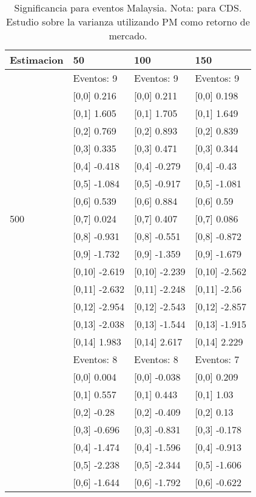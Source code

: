 \begin{table}

\caption{Significancia para eventos Malaysia. Nota: para CDS. Estudio sobre la varianza utilizando PM como retorno de mercado.}
\centering
\begin{tabular}[t]{llll}
\toprule
Estimacion & 50 & 100 & 150\\
\midrule
 & Eventos:  9 & Eventos:  9 & Eventos:  9\\
 & {}[0,0] 0.216 & {}[0,0] 0.211 & {}[0,0] 0.198\\
 & {}[0,1] 1.605 & {}[0,1] 1.705 & {}[0,1] 1.649\\
 & {}[0,2] 0.769 & {}[0,2] 0.893 & {}[0,2] 0.839\\
 & {}[0,3] 0.335 & {}[0,3] 0.471 & {}[0,3] 0.344\\
\addlinespace
 & {}[0,4] -0.418 & {}[0,4] -0.279 & {}[0,4] -0.43\\
 & {}[0,5] -1.084 & {}[0,5] -0.917 & {}[0,5] -1.081\\
 & {}[0,6] 0.539 & {}[0,6] 0.884 & {}[0,6] 0.59\\
500 & {}[0,7] 0.024 & {}[0,7] 0.407 & {}[0,7] 0.086\\
 & {}[0,8] -0.931 & {}[0,8] -0.551 & {}[0,8] -0.872\\
\addlinespace
 & {}[0,9] -1.732 & {}[0,9] -1.359 & {}[0,9] -1.679\\
 & {}[0,10] -2.619 & {}[0,10] -2.239 & {}[0,10] -2.562\\
 & {}[0,11] -2.632 & {}[0,11] -2.248 & {}[0,11] -2.56\\
 & {}[0,12] -2.954 & {}[0,12] -2.543 & {}[0,12] -2.857\\
 & {}[0,13] -2.038 & {}[0,13] -1.544 & {}[0,13] -1.915\\
\addlinespace
 & {}[0,14] 1.983 & {}[0,14] 2.617 & {}[0,14] 2.229\\
 & Eventos:  8 & Eventos:  8 & Eventos:  7\\
 & {}[0,0] 0.004 & {}[0,0] -0.038 & {}[0,0] 0.209\\
 & {}[0,1] 0.557 & {}[0,1] 0.443 & {}[0,1] 1.03\\
 & {}[0,2] -0.28 & {}[0,2] -0.409 & {}[0,2] 0.13\\
\addlinespace
 & {}[0,3] -0.696 & {}[0,3] -0.831 & {}[0,3] -0.178\\
 & {}[0,4] -1.474 & {}[0,4] -1.596 & {}[0,4] -0.913\\
 & {}[0,5] -2.238 & {}[0,5] -2.344 & {}[0,5] -1.606\\
 & {}[0,6] -1.644 & {}[0,6] -1.792 & {}[0,6] -0.622\\

\end{tabular}
\end{table}
